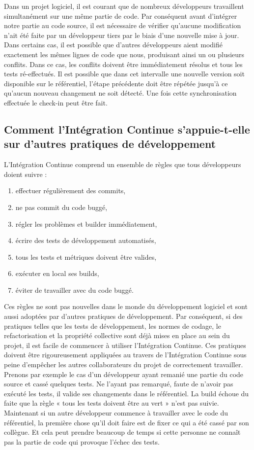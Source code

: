     Dans un projet logiciel, il est courant que de nombreux développeurs travaillent simultanément sur une même partie de code.  Par conséquent avant d’intégrer notre partie au code source, il est nécessaire de vérifier qu’aucune modification n’ait été faite par un développeur tiers par le biais d’une nouvelle mise à jour. Dans certains cas, il est possible que d’autres développeurs aient modifié exactement les mêmes lignes de code que nous, produisant ainsi un ou plusieurs conflits. Dans ce cas, les conflits doivent être immédiatement résolus et tous les tests ré-effectués. Il est possible que dans cet intervalle une nouvelle version soit disponible sur le référentiel, l'étape précédente doit être répétée jusqu'à ce qu'aucun nouveau changement ne soit détecté. Une fois cette synchronisation effectuée le check-in peut être fait.

    \subsection{Comment l’Intégration Continue s’appuie-t-elle sur d’autres pratiques de développement}\label{Developers}
    L’Intégration Continue comprend un ensemble de règles que tous développeurs doient suivre :

    \begin{enumerate}
      \item effectuer régulièrement des commits,
      \item ne pas commit du code buggé,
      \item régler les problèmes et builder immédiatement,
      \item écrire des tests de développement automatisés,
      \item tous les tests et métriques doivent être valides,
      \item exécuter en local ses builds,
      \item éviter de travailler avec du code buggé.\\
    \end{enumerate}

    Ces règles ne sont pas nouvelles dans le monde du développement logiciel et sont aussi adoptées par d'autres pratiques de développement. Par conséquent, si des pratiques telles que les tests de développement, les normes de codage, le refactorisation et la propriété collective sont déjà mises en place au sein du projet, il est facile de commencer à utiliser l’Intégration Continue. Ces pratiques doivent être rigoureusement appliquées au travers de l’Intégration Continue sous peine d’empêcher les autres collaborateurs du projet de correctement travailler. Prenons par exemple le cas d’un développeur ayant remanié une partie du code source et cassé quelques tests. Ne l’ayant pas remarqué, faute de n’avoir pas exécuté les tests, il valide ses changements dans le référentiel. La build échoue du faite que la règle « tous les tests doivent être au vert » n’est pas suivie. Maintenant si un autre développeur commence à travailler avec le code du référentiel, la première chose qu'il doit faire est de fixer ce qui a été cassé par son collègue. Et cela peut prendre beaucoup de temps si cette personne ne connaît pas la partie de code qui provoque l’échec des tests.

